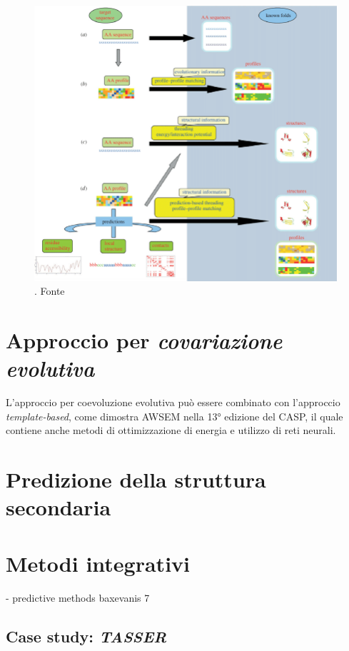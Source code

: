 \begin{figure}[!htb]
	\centering
	\includegraphics[scale=0.53]{images/threading-mappa.png}
	\caption{. Fonte\cite{joseph2014local}}
	\label{fig:fold-recognition}
\end{figure}

\section{Approccio per \textit{covariazione evolutiva}}



L'approccio per coevoluzione evolutiva può essere combinato con l'approccio \textit{template-based}, come dimostra AWSEM\supercite{jin2020protein} nella 13° edizione del CASP, il quale contiene anche metodi di ottimizzazione di energia e utilizzo di reti neurali.


\section{Predizione della struttura secondaria}


\section{Metodi integrativi}

- predictive methods
baxevanis 7

\subsection{Case study: \textit{TASSER}}

